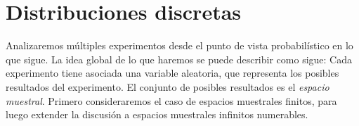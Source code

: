 \section{Distribuciones discretas}
\label{sec:distribuciones-discretas}

  Analizaremos múltiples experimentos
  desde el punto de vista probabilístico
  en lo que sigue.
  La idea global de lo que haremos se puede describir como sigue:
  Cada experimento tiene asociada una variable aleatoria,
  que representa los posibles resultados del experimento.
  El conjunto de posibles resultados es el \emph{espacio muestral}.%
  Primero consideraremos el caso de espacios muestrales finitos,
  para luego extender la discusión
  a espacios muestrales infinitos numerables.


